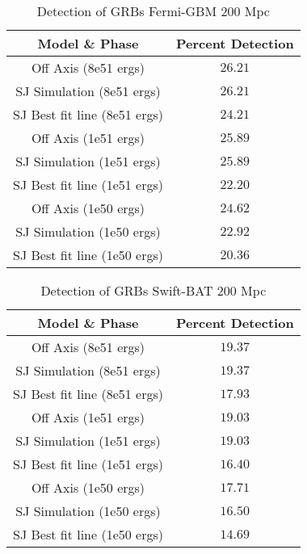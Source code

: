 \clearpage
\begin{table}
	\centering
	\caption{\label{FermiOnly} Detection of GRBs Fermi-GBM 200 Mpc}
	\begin{tabular}{|c|c|}
		\hline
		Model \& Phase               & Percent Detection \\ \hline
		Off Axis (8e51 ergs)         & $26.21$           \\ \hline 
		SJ Simulation (8e51 ergs)    & $26.21$           \\ \hline 
		SJ Best fit line (8e51 ergs) & $24.21$           \\ \hline 
		Off Axis (1e51 ergs)         & $25.89$           \\ \hline 
		SJ Simulation (1e51 ergs)    & $25.89$           \\ \hline 
		SJ Best fit line (1e51 ergs) & $22.20$           \\ \hline 
		Off Axis (1e50 ergs)         & $24.62$           \\ \hline 
		SJ Simulation (1e50 ergs)    & $22.92$           \\ \hline 
		SJ Best fit line (1e50 ergs) & $20.36$           \\ \hline 
	\end{tabular}
\end{table}

\begin{table}
	\centering
	\caption{\label{SwiftOnly} Detection of GRBs Swift-BAT 200 Mpc}
	\begin{tabular}{|c|c|}
		\hline
		Model \& Phase               & Percent Detection \\ \hline
		Off Axis (8e51 ergs)         & $19.37$           \\ \hline 
		SJ Simulation (8e51 ergs)    & $19.37$           \\ \hline 
		SJ Best fit line (8e51 ergs) & $17.93$           \\ \hline 
		Off Axis (1e51 ergs)         & $19.03$           \\ \hline 
		SJ Simulation (1e51 ergs)    & $19.03$           \\ \hline 
		SJ Best fit line (1e51 ergs) & $16.40$           \\ \hline 
		Off Axis (1e50 ergs)         & $17.71$           \\ \hline 
		SJ Simulation (1e50 ergs)    & $16.50$           \\ \hline 
		SJ Best fit line (1e50 ergs) & $14.69$           \\ \hline 
	\end{tabular}
\end{table}



